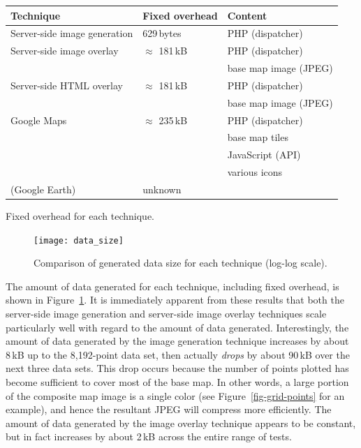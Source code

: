 \documentclass[acmtocl,acmnow]{acmtrans2m}
\begin{document}
\begin{acmtable}{11cm}
	\centering
	\begin{tabular}{lll}
		Technique						&	Fixed overhead		&	Content	\\
		\hline
		Server-side image generation	&	629\,bytes			&	PHP (dispatcher)\smallskip	\\

		Server-side image overlay		&	\(\approx\) 181\,kB	&	PHP (dispatcher) \\
										&						&	base map image (JPEG)\smallskip	\\

		Server-side HTML overlay		&	\(\approx\) 181\,kB	&	PHP (dispatcher) \\
										&						&	base map image (JPEG)\smallskip	\\

		Google Maps						&	\(\approx\) 235\,kB	&	PHP (dispatcher) \\
										&						&	base map tiles \\
										&						&	JavaScript (API) \\
										&						&	various icons\smallskip	\\

		(Google Earth)					&	unknown				&	\\
	\end{tabular}
	\caption{Fixed overhead for each technique.}
	\label{tab-overhead}
\end{acmtable}


\begin{figure}
	\texttt{[image: data\_size]}
	\caption{Comparison of generated data size for each technique (log-log scale).}
	\label{fig-data-size}
\end{figure}


The amount of data generated for each technique, including fixed
overhead, is shown in Figure~\ref{fig-data-size}. It is immediately
apparent from these results that both the server-side image generation
and server-side image overlay techniques scale particularly well with
regard to the amount of data generated. Interestingly, the amount of
data generated by the image generation technique increases by about
8\,kB up to the 8,192-point data set, then actually \emph{drops} by
about 90\,kB over the next three data sets. This drop occurs because the
number of points plotted has become sufficient to cover most of the base
map. In other words, a large portion of the composite map image is a
single color (see Figure~\ref{fig-grid-points} for an example), and hence
the resultant JPEG will compress more efficiently. The amount of data
generated by the image overlay technique appears to be constant, but in
fact increases by about 2\,kB across the entire range of tests.
\end{document}
